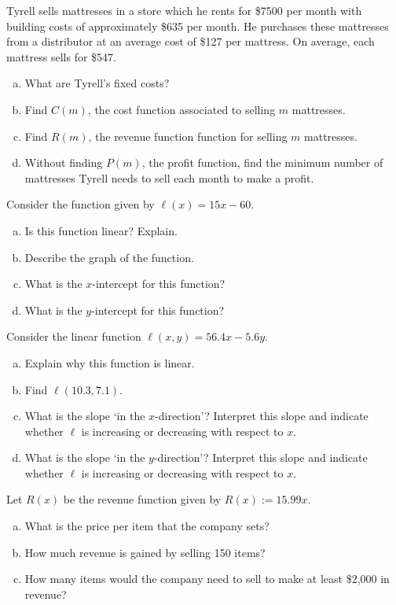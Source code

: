 \documentclass[11pt,letterpaper]{article}
\begin{document}
	
\prob Tyrell sells mattresses in a store which he rents for \$7500 per month with building costs of approximately \$635 per month. He purchases these mattresses from a distributor at an average cost of \$127 per mattress. On average, each mattress sells for \$547.
        \begin{enumerate}[(a)]
        \item What are Tyrell's fixed costs?
        \item Find $C(m)$, the cost function associated to selling $m$ mattresses. 
        \item Find $R(m)$, the revenue function function for selling $m$ mattresses. 
        \item Without finding $P(m)$, the profit function, find the minimum number of mattresses Tyrell needs to sell each month to make a profit. 
        \end{enumerate} \pspace	
	
	
\prob Consider the function given by $\ell(x)= 15x - 60$. 
        \begin{enumerate}[(a)]
        \item Is this function linear? Explain.
        \item Describe the graph of the function.
        \item What is the $x$-intercept for this function? 
        \item What is the $y$-intercept for this function? 
        \end{enumerate} \pspace


\prob Consider the linear function $\ell(x, y)= 56.4x - 5.6y$. 
        \begin{enumerate}[(a)]
        \item Explain why this function is linear. 
        \item Find $\ell(10.3, 7.1)$.
        \item What is the slope `in the $x$-direction'? Interpret this slope and indicate whether $\ell$ is increasing or decreasing with respect to $x$. 
        \item What is the slope `in the $y$-direction'? Interpret this slope and indicate whether $\ell$ is increasing or decreasing with respect to $x$. 
        \end{enumerate} \pspace	


\prob Let $R(x)$ be the revenue function given by $R(x):= 15.99x$. 
	\begin{enumerate}[(a)]
	\item What is the price per item that the company sets? 
	\item How much revenue is gained by selling 150 items? 
	\item How many items would the company need to sell to make at least \$2,000 in revenue?  
	\end{enumerate} \pspace	
	
\end{document}
